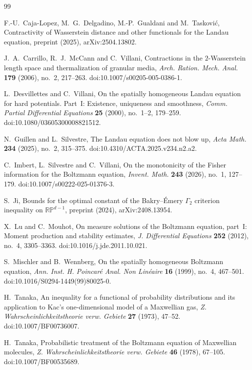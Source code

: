 \documentclass[11pt]{amsart}
\theoremstyle{definition}
\begin{document}
\begin{thebibliography}{99}

 F.-U.~Caja-Lopez, M.~G.~Delgadino, M.-P.~Gualdani and M.~Taskovi\'c, Contractivity of Wasserstein distance and other functionals for the Landau equation, preprint (2025), arXiv:2504.13802.

 J.~A.~Carrillo, R.~J.~McCann and C.~Villani, Contractions in the $2$-Wasserstein length space and thermalization of granular media, \emph{Arch. Ration. Mech. Anal.} \textbf{179} (2006), no.~2, 217--263. doi:10.1007/s00205-005-0386-1.

 L.~Desvillettes and C.~Villani, On the spatially homogeneous Landau equation for hard potentials. Part~I: Existence, uniqueness and smoothness, \emph{Comm. Partial Differential Equations} \textbf{25} (2000), no.~1--2, 179--259. doi:10.1080/03605300008821512.

 N.~Guillen and L.~Silvestre, The Landau equation does not blow up, \emph{Acta Math.} \textbf{234} (2025), no.~2, 315--375. doi:10.4310/ACTA.2025.v234.n2.a2.

 C.~Imbert, L.~Silvestre and C.~Villani, On the monotonicity of the Fisher information for the Boltzmann equation, \emph{Invent. Math.} \textbf{243} (2026), no.~1, 127--179. doi:10.1007/s00222-025-01376-3.

 S.~Ji, Bounds for the optimal constant of the Bakry--\'Emery $\Gamma_2$ criterion inequality on $\mathbb{RP}^{d-1}$, preprint (2024), arXiv:2408.13954.

 X.~Lu and C.~Mouhot, On measure solutions of the Boltzmann equation, part~I: Moment production and stability estimates, \emph{J. Differential Equations} \textbf{252} (2012), no.~4, 3305--3363. doi:10.1016/j.jde.2011.10.021.

 S.~Mischler and B.~Wennberg, On the spatially homogeneous Boltzmann equation, \emph{Ann. Inst. H. Poincar\'e Anal. Non Lin\'eaire} \textbf{16} (1999), no.~4, 467--501. doi:10.1016/S0294-1449(99)80025-0.

 H.~Tanaka, An inequality for a functional of probability distributions and its application to Kac's one-dimensional model of a Maxwellian gas, \emph{Z. Wahrscheinlichkeitstheorie verw. Gebiete} \textbf{27} (1973), 47--52. doi:10.1007/BF00736007.

 H.~Tanaka, Probabilistic treatment of the Boltzmann equation of Maxwellian molecules, \emph{Z. Wahrscheinlichkeitstheorie verw. Gebiete} \textbf{46} (1978), 67--105. doi:10.1007/BF00535689.


\end{thebibliography}
\end{document}
